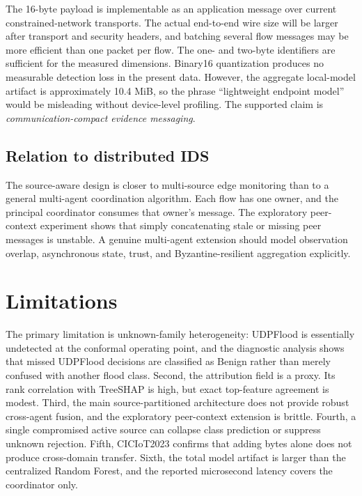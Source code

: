 The 16-byte payload is implementable as an application message over current constrained-network transports. The actual end-to-end wire size will be larger after transport and security headers, and batching several flow messages may be more efficient than one packet per flow. The one- and two-byte identifiers are sufficient for the measured dimensions. Binary16 quantization produces no measurable detection loss in the present data. However, the aggregate local-model artifact is approximately 10.4 MiB, so the phrase ``lightweight endpoint model'' would be misleading without device-level profiling. The supported claim is \emph{communication-compact evidence messaging}.

\subsection{Relation to distributed IDS}

The source-aware design is closer to multi-source edge monitoring than to a general multi-agent coordination algorithm. Each flow has one owner, and the principal coordinator consumes that owner's message. The exploratory peer-context experiment shows that simply concatenating stale or missing peer messages is unstable. A genuine multi-agent extension should model observation overlap, asynchronous state, trust, and Byzantine-resilient aggregation explicitly.

\section{Limitations}

The primary limitation is unknown-family heterogeneity: UDPFlood is essentially undetected at the conformal operating point, and the diagnostic analysis shows that missed UDPFlood decisions are classified as Benign rather than merely confused with another flood class. Second, the attribution field is a proxy. Its rank correlation with TreeSHAP is high, but exact top-feature agreement is modest. Third, the main source-partitioned architecture does not provide robust cross-agent fusion, and the exploratory peer-context extension is brittle. Fourth, a single compromised active source can collapse class prediction or suppress unknown rejection. Fifth, CICIoT2023 confirms that adding bytes alone does not produce cross-domain transfer. Sixth, the total model artifact is larger than the centralized Random Forest, and the reported microsecond latency covers the coordinator only.
